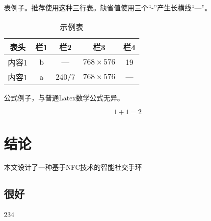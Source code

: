 表例子。推荐使用这种三行表。缺省值使用三个“-”产生长横线“---”。

\begin{table}[!t]
\caption{示例表}
\label{tab:eg}
\vspace{0.5em}
\centering
\wuhao
  \begin{tabular}{ccccc}
  \toprule[1.5pt]
  表头 & 栏1 & 栏2 & 栏3 & 栏4 \\
  \midrule[1pt]
  内容1 & b & --- & $768 \times 576$ & 19 \\
  内容1 & a & 240/7 & $768 \times 576$ & --- \\
  \bottomrule[1.5pt]
  \end{tabular}
\end{table}

公式例子，与普通Latex数学公式无异。

\begin{equation}
1+1=2
\end{equation}







\chapter{结论}
本文设计了一种基于NFC技术的智能社交手环

\section*{很好}

234